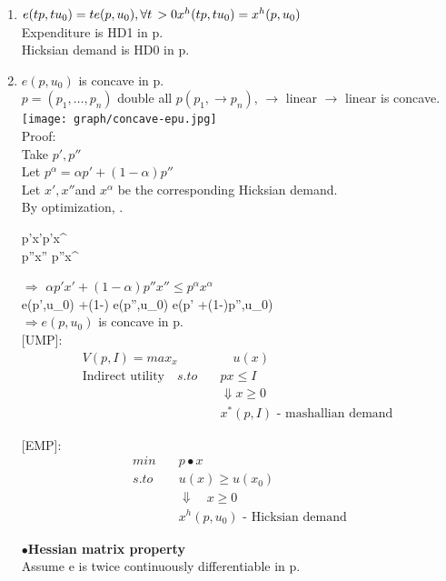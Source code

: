 \documentclass[letterpaper,13pt,single,pdftex]{scrartcl}
\newenvironment{rcases}
  {\left.\begin{aligned}}
  {\end{aligned}\right\rbrace}
\begin{document}
{\begin{enumerate}
    \item
    $e(tp,tu_0) = t e(p,u_0), \forall t\,> 0\\ 
    x^h(tp,tu_0) = x^h(p, u_0)$\\
    Expenditure is HD1 in p.\\
    Hicksian demand is HD0 in p.\\
    
    \item
     $ e(p,u_0)$ is concave in p.\\
     $p=(p_1,\dots, p_n)$ double all $p(p_1,\rightarrow p_n), \, \rightarrow$ linear $ \rightarrow$ linear is concave.\\
     \texttt{[image: graph/concave-epu.jpg]}\\
     Proof:\\
     Take $p', p''$\\
     Let $p^{\alpha} = \alpha p' +(1-\alpha)p''$\\
     Let $x',x'' $and $x^{\alpha}$ be the corresponding Hicksian demand.\\
     By optimization, \begin{rcases}
          p'x'\le p'x^{\alpha}\\
          p''x'' \le p''x^{\alpha}
     \end{rcases}
    $\Rightarrow$ 
        $\alpha p'x' +(1-\alpha)p''x'' \le p^{\alpha}x^{\alpha} $\\
        \alpha e(p',u_0) +(1-\alpha) e(p'',u_0) \le e(\alpha p' +(1-\alpha)p'',u_0)\\
        $\Rightarrow e(p,u_0)$ is concave in p.  \\
 
 [UMP]:   
    \begin{align*}
    V(p,I) = max_x &\quad u(x)\\
    \text{Indirect utility} \quad s.to \quad &px\le I\\
    &\Downarrow x\ge 0\\
    &x^*(p,I) \text{ - mashallian demand }
\end{align*}
 
 [EMP]:
 \begin{align*}
    min \quad &p \bullet x\\
    s.to \quad &u(x) \ge u(x_0)\\
    &\Downarrow \quad x\ge 0\\
    &x^h(p,u_0)  \text{ - Hicksian demand}
\end{align*}
    
$\bullet$\textbf{Hessian matrix property}\\
Assume e is twice continuously differentiable in p.\\


\end{enumerate}}
\end{document}
